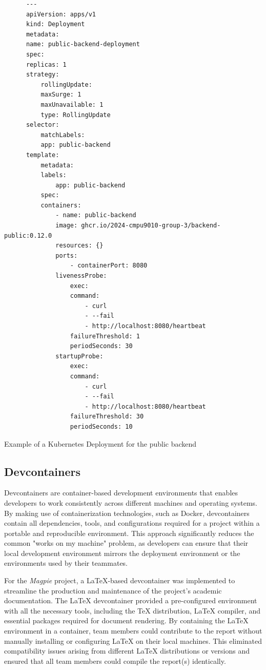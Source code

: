 \begin{listing}[htbp]
    \begin{verbatim}
      ---
      apiVersion: apps/v1
      kind: Deployment
      metadata:
      name: public-backend-deployment
      spec:
      replicas: 1
      strategy:
          rollingUpdate:
          maxSurge: 1
          maxUnavailable: 1
          type: RollingUpdate
      selector:
          matchLabels:
          app: public-backend
      template:
          metadata:
          labels:
              app: public-backend
          spec:
          containers:
              - name: public-backend
              image: ghcr.io/2024-cmpu9010-group-3/backend-public:0.12.0
              resources: {}
              ports:
                  - containerPort: 8080
              livenessProbe:
                  exec:
                  command:
                      - curl
                      - --fail
                      - http://localhost:8080/heartbeat
                  failureThreshold: 1
                  periodSeconds: 30
              startupProbe:
                  exec:
                  command:
                      - curl
                      - --fail
                      - http://localhost:8080/heartbeat
                  failureThreshold: 30
                  periodSeconds: 10
    \end{verbatim}
    \caption{Example of a Kubernetes Deployment for the public backend}
\end{listing}

\subsection{Devcontainers}
Devcontainers are container-based development environments that enables
developers to work consistently across different machines and operating systems.
By making use of containerization technologies, such as Docker, devcontainers
contain all dependencies, tools, and configurations required for a project
within a portable and reproducible environment. This approach significantly
reduces the common "works on my machine" problem, as developers can ensure that
their local development environment mirrors the deployment environment or the
environments used by their teammates.

For the \textit{Magpie} project, a LaTeX-based devcontainer was implemented to
streamline the production and maintenance of the project's academic
documentation. The LaTeX devcontainer provided a pre-configured environment with
all the necessary tools, including the TeX distribution, LaTeX compiler, and
essential packages required for document rendering. By containing the LaTeX
environment in a container, team members could contribute to the report without
manually installing or configuring LaTeX on their local machines. This
eliminated compatibility issues arising from different LaTeX distributions or
versions and ensured that all team members could compile the report(s)
identically.


